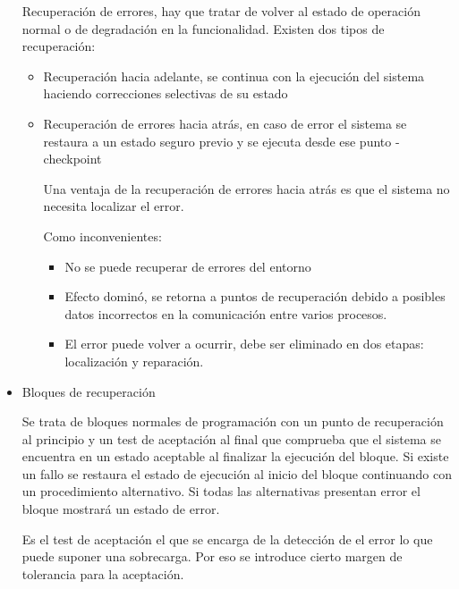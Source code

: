 \begin{itemize}
		Recuperación de errores, hay que tratar de volver al estado de
		operación normal o de degradación en la funcionalidad. Existen
		dos tipos de recuperación:

		\begin{itemize}
			\item Recuperación hacia adelante, se continua con la
				ejecución del sistema haciendo correcciones
				selectivas de su estado
			\item Recuperación de errores hacia atrás, en caso de
				error el sistema se restaura a un estado seguro
				previo y se ejecuta desde ese punto - checkpoint

				Una ventaja de la recuperación de errores hacia
				atrás es que el sistema no necesita localizar el
				error.

				Como inconvenientes:

				\begin{itemize}
					\item No se puede recuperar de errores
						del entorno
					\item Efecto dominó, se retorna a puntos
						de recuperación debido a
						posibles datos incorrectos en la
						comunicación entre varios
						procesos.
					\item El error puede volver a ocurrir,
						debe ser eliminado en dos
						etapas: localización y
						reparación.
				\end{itemize}
		\end{itemize}
	\item Bloques de recuperación

		Se trata de bloques normales de programación con un punto de
		recuperación al principio y un test de aceptación al final que
		comprueba que el sistema se encuentra en un estado aceptable al
		finalizar la ejecución del bloque. Si existe un fallo se
		restaura el estado de ejecución al inicio del bloque continuando
		con un procedimiento alternativo. Si todas las alternativas
		presentan error el bloque mostrará un estado de error.

		Es el test de aceptación el que se encarga de la detección de el
		error lo que puede suponer una sobrecarga. Por eso se introduce
		cierto margen de tolerancia para la aceptación.
\end{itemize}

